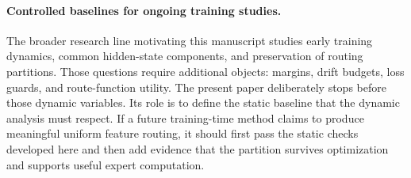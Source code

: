 \paragraph{Controlled baselines for ongoing training studies.}
The broader research line motivating this manuscript studies early training
dynamics, common hidden-state components, and preservation of routing
partitions. Those questions require additional objects: margins, drift budgets,
loss guards, and route-function utility. The present paper deliberately stops
before those dynamic variables. Its role is to define the static baseline that
the dynamic analysis must respect. If a future training-time method claims to
produce meaningful uniform feature routing, it should first pass the static
checks developed here and then add evidence that the partition survives
optimization and supports useful expert computation.

